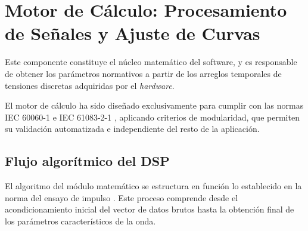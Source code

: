 \section{Motor de Cálculo: Procesamiento de Señales y Ajuste de Curvas}
\label{subsec:motor_calculo}

Este componente constituye el núcleo matemático del software, y es responsable de obtener los parámetros normativos a partir de los arreglos temporales de tensiones discretas adquiridas por el \emph{hardware}.

El motor de cálculo ha sido diseñado exclusivamente para cumplir con las normas IEC 60060-1 \cite{iec60060_1} e IEC 61083-2-1 \cite{iec61083_2}, aplicando criterios de modularidad, que permiten su validación automatizada e independiente del resto de la aplicación.

\subsection{Flujo algorítmico del DSP}
\label{subsubsec:flujo_algoritmico}

El algoritmo del módulo matemático se estructura en función lo establecido en la norma del ensayo de impulso \cite{iec60060_1}.
Este proceso comprende desde el acondicionamiento inicial del vector de datos brutos hasta la obtención final de los parámetros característicos de la onda.

